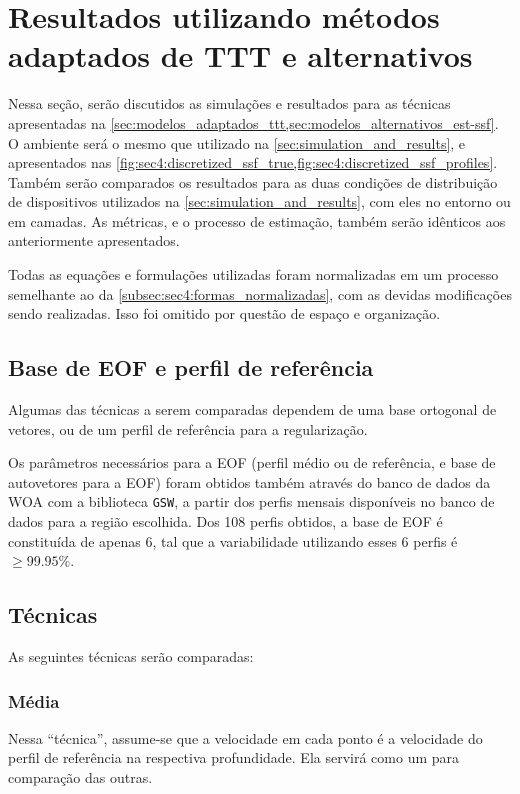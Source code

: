\section{Resultados utilizando métodos adaptados de TTT e alternativos}

Nessa seção, serão discutidos as simulações e resultados para as técnicas apresentadas na \cref{sec:modelos_adaptados_ttt,sec:modelos_alternativos_est-ssf}. O ambiente será o mesmo que utilizado na \cref{sec:simulation_and_results}, e apresentados nas \cref{fig:sec4:discretized_ssf_true,fig:sec4:discretized_ssf_profiles}. Também serão comparados os resultados para as duas condições de distribuição de dispositivos utilizados na \cref{sec:simulation_and_results}, com eles no entorno ou em camadas. As métricas, e o processo de estimação, também serão idênticos aos anteriormente apresentados.

Todas as equações e formulações utilizadas foram normalizadas em um processo semelhante ao da \cref{subsec:sec4:formas_normalizadas}, com as devidas modificações sendo realizadas. Isso foi omitido por questão de espaço e organização.

\subsection{Base de EOF e perfil de referência}

Algumas das técnicas a serem comparadas dependem de uma base ortogonal de vetores, ou de um perfil de referência para a regularização.

Os parâmetros necessários para a EOF (perfil médio ou de referência, e base de autovetores para a EOF) foram obtidos também através do banco de dados da WOA com a biblioteca \texttt{GSW}, a partir dos perfis mensais disponíveis no banco de dados para a região escolhida. Dos 108 perfis obtidos, a base de EOF é constituída de apenas 6, tal que a variabilidade utilizando esses 6 perfis é $\geq 99.95\%$.

\subsection{Técnicas}

As seguintes técnicas serão comparadas:

\subsubsection*{Média}

Nessa ``técnica'', assume-se que a velocidade em cada ponto é a velocidade do perfil de referência na respectiva profundidade.  Ela servirá como um  para comparação das outras.

